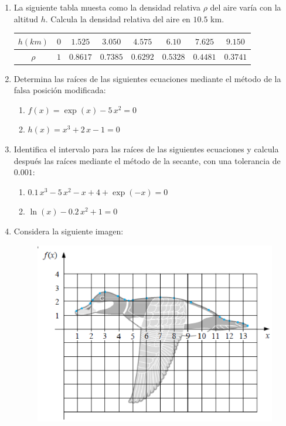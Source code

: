 \begin{enumerate}
\item La siguiente tabla muesta como la densidad relativa $\rho$ del aire varía con la altitud $h$. Calcula la densidad relativa del aire en $10.5$ km.
\begin{table}[H]
\centering 
\begin{tabular}{c | c | c | c | c | c | c | c |}
$h (km)$ & $0$ & $1.525$ & $3.050$ & $4.575$ & $6.10$ & $7.625$ & $9.150$ \\ \hline
$\rho$ & $1$ & $0.8617$ & $0.7385$ & $0.6292$ & $0.5328$ & $0.4481$ & $0.3741$ 
\end{tabular}
\end{table}
\item Determina las raíces de las siguientes ecuaciones mediante el método de la falsa posición modificada:
\begin{enumerate}
\renewcommand{\arraystretch}{1.5}
\item $f(x) = \exp(x) - 5 \, x^{2} = 0$
\item $h(x) = x^{3} + 2 \, x - 1 = 0$
\end{enumerate}
\item Identifica el intervalo para las raíces de las siguientes ecuaciones y calcula después las raíces mediante el método de la secante, con una tolerancia de $0.001$:
\begin{enumerate}
\item $0.1 \, x^{3} - 5 \, x^{2} - x + 4 + \exp(-x) = 0$
\item $\ln(x) -0.2 \, x^{2} + 1 = 0$
\end{enumerate}
\item Considera la siguiente imagen:
\begin{figure}[H]
	\centering
	\includegraphics[scale=0.7]{Imagenes/ContornoPato.eps}  

\end{figure}
\end{enumerate}
